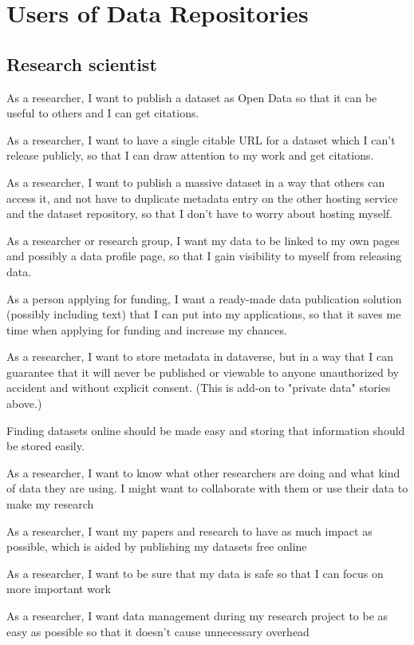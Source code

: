 \chapter{Users of Data Repositories}
\label{chapter:first-appendix}

\section{Research scientist}

\begin{compactitem}
    \item As a researcher, I want to publish a dataset as Open Data so that it
          can be useful to others and I can get citations.
    \item As a researcher, I want to have a single citable URL for a dataset
          which I can't release publicly, so that I can draw attention to my
          work and get citations. 
    \item As a researcher, I want to publish a massive dataset in a way that
          others can access it, and not have to duplicate metadata entry on the
          other hosting service and the dataset repository, so that I don't have
          to worry about hosting myself. 
    \item As a researcher or research group, I want my data to be linked to my
          own pages and possibly a data profile page, so that I gain visibility
          to myself from releasing data. 
    \item As a person applying for funding, I want a ready-made data publication
          solution (possibly including text) that I can put into my
          applications, so that it saves me time when applying for funding and
          increase my chances. 
    \item As a researcher, I want to store metadata in dataverse, but in a way
          that I can guarantee that it will never be published or viewable to
          anyone unauthorized by accident and without explicit consent.  (This
          is add-on to "private data" stories above.)
    \item Finding datasets online should be made easy and storing that information
          should be stored easily.
    \item As a researcher, I want to know what other researchers are doing and
          what kind of data they are using. I might want to collaborate with
          them or use their data to make my research
    \item As a researcher, I want my papers and research to have as much impact
          as possible, which is aided by publishing my datasets free online
    \item As a researcher, I want to be sure that my data is safe so that I can
          focus on more important work
    \item As a researcher, I want data management during my research project to
          be as easy as possible so that it doesn't cause unnecessary overhead
\end{compactitem}

